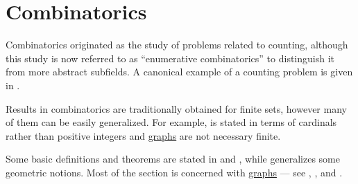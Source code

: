 \section{Combinatorics}\label{sec:combinatorics}

Combinatorics originated as the study of problems related to counting, although this study is now referred to as \enquote{enumerative combinatorics} to distinguish it from more abstract subfields. A canonical example of a counting problem is given in .

Results in combinatorics are traditionally obtained for finite sets, however many of them can be easily generalized. For example,  is stated in terms of cardinals rather than positive integers and \hyperref[def:directed_graph]{graphs} are not necessary finite.

Some basic definitions and theorems are stated in  and , while  generalizes some geometric notions. Most of the section is concerned with \hyperref[rem:directed_and_undirected_graphs]{graphs} --- see , ,  and .

